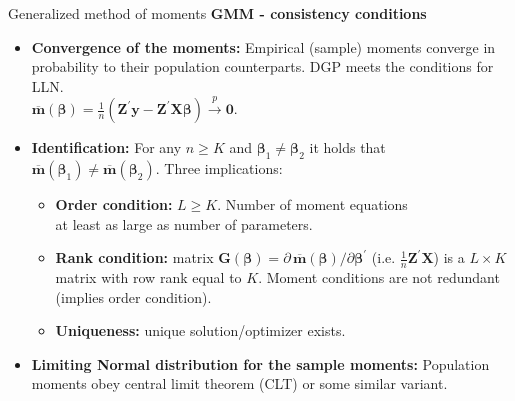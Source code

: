 \documentclass{beamer}
\begin{document}
\begin{frame}{Generalized method of moments}
\textbf{GMM - consistency conditions}\\

\medskip
\begin{itemize}
  \item \textbf{Convergence of the moments:} Empirical (sample) moments converge in probability to their population counterparts. DGP meets the conditions for LLN. \\ \smallskip
  $\overline{\mathbf{m}}(\bm{\beta}) = \frac{1}{n} \left(  \bm{Z}^{\prime} \bm{y} -  \bm{Z}^{\prime} \bm{X}  \bm{\beta} \right) \xrightarrow{p} \bm{0}$.
  \medskip
  \item \textbf{Identification:} For any $n \geq K$ and $\bm{\beta}_1 \neq \bm{\beta}_2$ it holds that $\overline{\mathbf{m}}(\bm{\beta}_1) \neq \overline{\mathbf{m}}(\bm{\beta}_2)$. Three implications:\\
  \medskip
  \begin{itemize}
      \item \textbf{Order condition:} $L \geq K$. Number of moment equations \\at least as large as number of parameters.
      \smallskip
      \item \textbf{Rank condition:} matrix $\bm{G}(\bm{\beta})=\partial \, \overline{\mathbf{m}}(\bm{\beta}) / \partial \bm{\beta}^{\prime}$ (i.e. $\frac{1}{n}\bm{Z}^{\prime} \bm{X}$) is a $L\! \times \! K$ matrix with row rank equal to $K$. Moment conditions are not redundant (implies order condition).
      \smallskip
      \item \textbf{Uniqueness:} unique solution/optimizer exists.
  \end{itemize}
\medskip
\item \textbf{Limiting Normal distribution for the sample moments:} Population moments obey central limit theorem (CLT) or some similar variant.
\end{itemize}
\end{frame}
\end{document}
